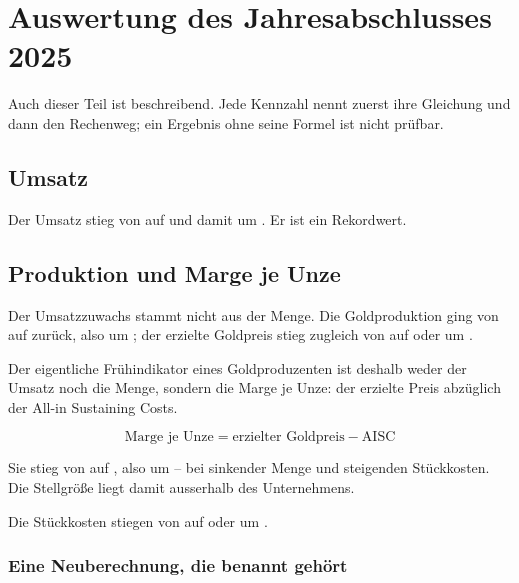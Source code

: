 \section{Auswertung des Jahresabschlusses 2025}
\label{sec:abschluss}

Auch dieser Teil ist beschreibend. Jede Kennzahl nennt zuerst ihre Gleichung
und dann den Rechenweg; ein Ergebnis ohne seine Formel ist nicht pr\"ufbar.

\subsection{Umsatz}

Der Umsatz stieg von \MioUSDexakt{\UmsatzVJ} auf \MioUSDexakt{\Umsatz} und
damit um \Pct{\UmsatzDelta}. Er ist ein Rekordwert.

\subsection{Produktion und Marge je Unze}
\label{sec:margejeunze}

Der Umsatzzuwachs stammt nicht aus der Menge. Die Goldproduktion ging von
\Unzen{\ProduktionXXIV} auf \Unzen{\ProduktionXXV} zur\"uck, also um
\PctBetrag{\ProduktionDelta}; der erzielte Goldpreis stieg zugleich von
\JeUnze{\GoldpreisVJ} auf \JeUnze{\Goldpreis} oder um
\Pct{\GoldpreisDelta}.

Der eigentliche Fr\"uhindikator eines Goldproduzenten ist deshalb weder der
Umsatz noch die Menge, sondern die Marge je Unze: der erzielte Preis abz\"uglich
der All-in Sustaining Costs.

\begin{equation}
\label{eq:marge-je-unze}
\text{Marge je Unze} = \text{erzielter Goldpreis} - \text{AISC}
\end{equation}

Sie stieg von \JeUnze{\MargeJeUnzeVJ} auf \JeUnze{\MargeJeUnze}, also um
\Pct{\MargeJeUnzeDelta} -- bei sinkender Menge und steigenden St\"uckkosten.
Die Stellgr\"o{\ss}e liegt damit ausserhalb des Unternehmens.

Die St\"uckkosten stiegen von \JeUnze{\AISCVJneu} auf \JeUnze{\AISCXXV}
oder um \Pct{\AISCDelta}.

\subsubsection*{Eine Neuberechnung, die benannt geh\"ort}

